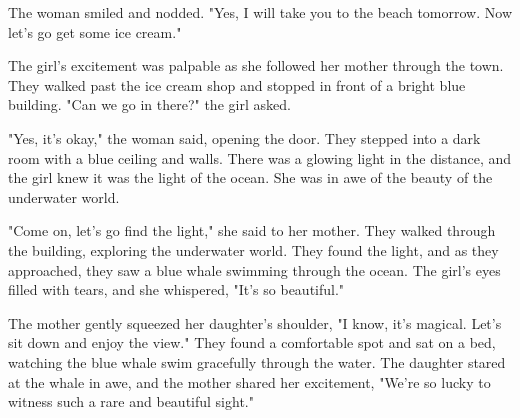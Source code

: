 \documentclass[smalldemyvopaper,11pt,twoside,onecolumn,openright,extrafontsizes]{memoir}
\begin{document}
The woman smiled and nodded. "Yes, I will take you to the beach tomorrow. Now let's go get some ice cream."\par
The girl's excitement was palpable as she followed her mother through the town. They walked past the ice cream shop and stopped in front of a bright blue building. "Can we go in there?" the girl asked.\par
"Yes, it's okay," the woman said, opening the door. They stepped into a dark room with a blue ceiling and walls. There was a glowing light in the distance, and the girl knew it was the light of the ocean. She was in awe of the beauty of the underwater world.\par
"Come on, let's go find the light," she said to her mother. They walked through the building, exploring the underwater world. They found the light, and as they approached, they saw a blue whale swimming through the ocean. The girl's eyes filled with tears, and she whispered, "It's so beautiful."\par
The mother gently squeezed her daughter's shoulder, "I know, it's magical. Let's sit down and enjoy the view." They found a comfortable spot and sat on a bed, watching the blue whale swim gracefully through the water. The daughter stared at the whale in awe, and the mother shared her excitement, "We're so lucky to witness such a rare and beautiful sight."\par
\end{document}

